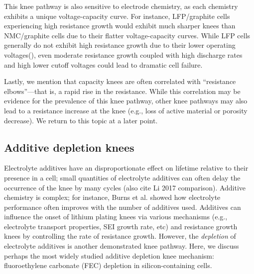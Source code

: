 \documentclass[journal=jpcl, manuscript=article, layout=onecolumn]{achemso}
\begin{document}
This knee pathway is also sensitive to electrode chemistry, as each chemistry exhibits a unique voltage-capacity curve. For instance, LFP/graphite cells experiencing high resistance growth would exhibit much sharper knees than NMC/graphite cells due to their flatter voltage-capacity curves. While LFP cells generally do not exhibit high resistance growth due to their lower operating voltages(), even moderate resistance growth coupled with high discharge rates and high lower cutoff voltages could lead to dramatic cell failure.

Lastly, we mention that capacity knees are often correlated with ``resistance elbows''---that is, a rapid rise in the resistance. While this correlation may be evidence for the prevalence of this knee pathway, other knee pathways may also lead to a resistance increase at the knee (e.g., loss of active material or porosity decrease). We return to this topic at a later point.

\subsection{Additive depletion knees}

Electrolyte additives have an disproportionate effect on lifetime relative to their presence in a cell; small quantities of electrolyte additives can often delay the occurrence of the knee by many cycles\cite{ma_editors_2019} (also cite Li 2017 comparison). Additive chemistry is complex; for instance, Burns et al.\cite{burns_predicting_2013} showed how electrolyte performance often improves with the number of additives used. Additives can influence the onset of lithium plating knees via various mechanisms (e.g., electrolyte transport properties, SEI growth rate, etc) and resistance growth knees by controlling the rate of resistance growth\cite{ma_editors_2019}. However, the \textit{depletion} of electrolyte additives is another demonstrated knee pathway. Here, we discuss perhaps the most widely studied additive depletion knee mechanism: fluoroethylene carbonate (FEC) depletion in silicon-containing cells.
\end{document}
